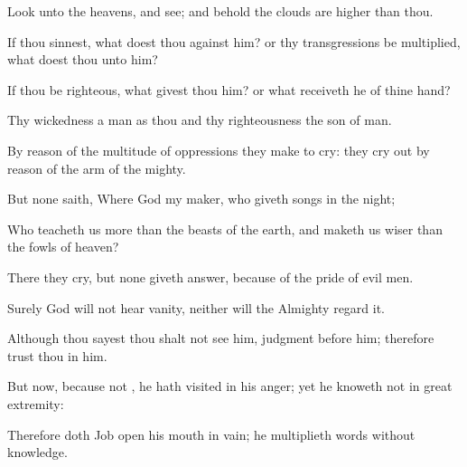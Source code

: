 {Look unto the
heavens, and
see; and
behold the
clouds
{} are
higher than thou.

If thou
sinnest, what
doest thou against him? or
{} thy
transgressions be
multiplied, what
doest thou unto him?

If thou be
righteous, what
givest thou him? or what
receiveth he of thine
hand?

Thy
wickedness
{} a
man as thou
{} and thy
righteousness
{} the
son of
man.


\par }{\PP {}By reason of the
multitude of
oppressions they make
{} to
cry: they cry
out by reason of the
arm of the
mighty.

But none
saith, Where
{}
God my
maker, who
giveth
songs in the
night;

Who
teacheth us more than the
beasts of the
earth, and maketh us
wiser than the
fowls of
heaven?

There they
cry, but none giveth
answer,
because of the
pride of evil
men.

Surely
God will not
hear
vanity, neither will the
Almighty
regard it.


\par }{\PP {}Although thou
sayest thou shalt not
see him,
{}
judgment
{}
before him; therefore
trust thou in him.

But now, because
{} not
{}, he hath
visited in his
anger; yet he
knoweth
{} not in
great
extremity:

Therefore doth
Job
open his
mouth in
vain; he
multiplieth
words
without
knowledge.




\par }
